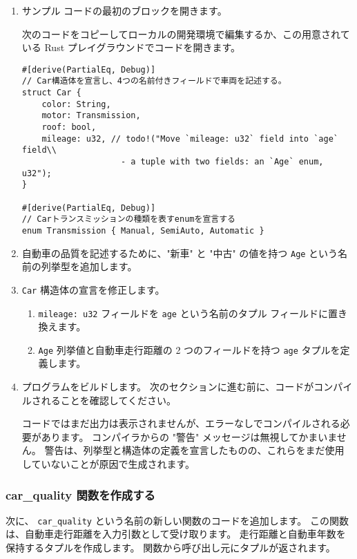 \begin{enumerate}
\item サンプル コードの最初のブロックを開きます。

次のコードをコピーしてローカルの開発環境で編集するか、この用意されている Rust プレイグラウンドでコードを開きます。


\begin{lstlisting}[numbers=none]
#[derive(PartialEq, Debug)]
// Car構造体を宣言し、4つの名前付きフィールドで車両を記述する。
struct Car {
    color: String,
    motor: Transmission,
    roof: bool,
    mileage: u32, // todo!("Move `mileage: u32` field into `age` field\\
                    - a tuple with two fields: an `Age` enum, u32");
}

#[derive(PartialEq, Debug)]
// Carトランスミッションの種類を表すenumを宣言する
enum Transmission { Manual, SemiAuto, Automatic }
\end{lstlisting}

\item 自動車の品質を記述するために、"新車" と "中古" の値を持つ \texttt{Age} という名前の列挙型を追加します。

\item \texttt{Car} 構造体の宣言を修正します。

\begin{enumerate}
\item \texttt{mileage: u32} フィールドを \texttt{age} という名前のタプル フィールドに置き換えます。
\item \texttt{Age} 列挙値と自動車走行距離の 2 つのフィールドを持つ \texttt{age} タプルを定義します。
\end{enumerate}

\item プログラムをビルドします。 次のセクションに進む前に、コードがコンパイルされることを確認してください。

コードではまだ出力は表示されませんが、エラーなしでコンパイルされる必要があります。 コンパイラからの "警告" メッセージは無視してかまいません。 警告は、列挙型と構造体の定義を宣言したものの、これらをまだ使用していないことが原因で生成されます。
\end{enumerate}


\subsubsection{car\_quality 関数を作成する}

次に、 \texttt{car\_quality} という名前の新しい関数のコードを追加します。 この関数は、自動車走行距離を入力引数として受け取ります。 走行距離と自動車年数を保持するタプルを作成します。 関数から呼び出し元にタプルが返されます。

